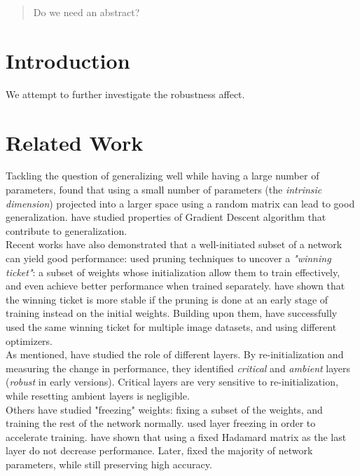 \documentclass{article}
\begin{document}

\begin{abstract}
Do we need an abstract?
\end{abstract}
\section{Introduction}

We attempt to further investigate the robustness affect.
\section{Related Work}
Tackling the question of generalizing well while having a large number of parameters, \cite{intrinsic} found that using a small number of parameters (the \textit{intrinsic dimension}) projected into a larger space using a random matrix can lead to good generalization. \cite{sgdAlign} have studied properties of Gradient Descent algorithm that contribute to generalization.\\
Recent works have also demonstrated that a well-initiated subset of a network can yield good performance: \cite{frankle2018lottery} used pruning techniques to uncover a \textit{"winning ticket"}: a subset of weights whose initialization allow them to train effectively, and even achieve better performance when trained separately. \cite{lotteryAtScale} have shown that the winning ticket is more stable if the pruning is done at an early stage of training instead on the initial weights. Building upon them, \cite{generalizingLottery} have successfully used the same winning ticket for multiple image datasets, and using different optimizers.\\
As mentioned, \cite{allLayers} have studied the role of different layers. By re-initialization and measuring the change in performance, they identified \textit{critical} and \textit{ambient} layers (\textit{robust} in early versions). Critical layers are very sensitive to re-initialization, while resetting ambient layers is negligible.\\
Others have studied "freezing" weights: fixing a subset of the weights, and training the rest of the network normally. \cite{freezeout} used layer freezing in order to accelerate training. \cite{fixLastLayerToHadamard} have shown that using a fixed Hadamard matrix as the last layer do not decrease performance. Later, \cite{learningNothing} fixed the majority of network parameters, while still preserving high accuracy. 
\end{document}
